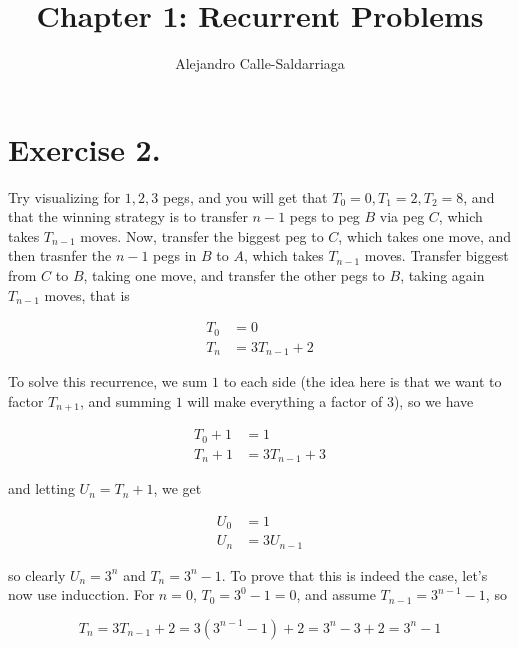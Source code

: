 \documentclass[a4paper]{article}
\begin{document}
\title{Chapter 1: Recurrent Problems}
\author{Alejandro Calle-Saldarriaga\\
	}

\section*{Exercise 2.}

Try visualizing for $1, 2, 3$ pegs, and you will get that 
$T_0 = 0, T_1 = 2, T_2 = 8$, and that the winning strategy 
is to transfer $n-1$ pegs to peg $B$ via peg $C$, which takes 
$T_{n-1}$ moves. Now, transfer the biggest peg to $C$, which takes
one move, and then trasnfer the $n-1$ pegs in $B$ to $A$, which takes 
$T_{n-1}$ moves. Transfer biggest from $C$ to $B$, taking one move, and 
transfer the other pegs to $B$, taking again $T_{n-1}$ moves, that is

\begin{align*}
    T_0 & = 0 \\
    T_{n} & = 3T_{n-1} + 2
\end{align*}

To solve this recurrence, we sum $1$ to each side (the idea here 
is that we want to factor $T_{n+1}$, and summing $1$ will make everything a 
factor of $3$), so we have 

\begin{align*}
    T_0 + 1 & = 1 \\
    T_{n} + 1 & = 3T_{n-1} + 3
\end{align*}

and letting $U_n = T_{n} + 1$, we get 

\begin{align*}
    U_0 & = 1 \\
    U_n & = 3U_{n-1}
\end{align*}

so clearly $U_n = 3^n$ and $T_n = 3^n - 1$. To prove that this is indeed the 
case, let's now use inducction. For $n=0$, $T_0 = 3^0 - 1 = 0$, and assume 
$T_{n-1} = 3^{n-1} - 1$, so 

\begin{equation*}
    T_n = 3T_{n-1} + 2 = 3(3^{n-1}-1) + 2 = 3^n - 3 + 2 = 3^n - 1
\end{equation*}
\end{document}
